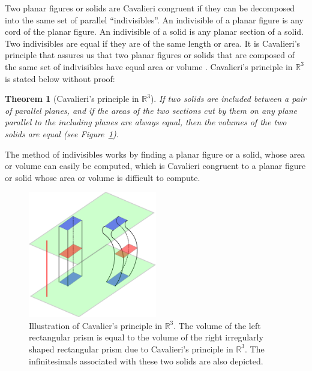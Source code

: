 \documentclass{article}
\theoremstyle{theorem}
\newtheorem{theorem}{Theorem}
\theoremstyle{definition}
\begin{document}
\noindent
Two planar figures or solids are Cavalieri congruent if they can be decomposed into the same set of parallel ``indivisibles''. An indivisible of 
a planar figure is any cord of the planar figure. An indivisible of a solid is any planar section of a solid. Two indivisibles are equal if they are of the same length or area.
It is Cavalieri's principle that assures us that two planar figures or solids that are composed of the same set of indivisibles have equal area or volume \cite{andersen1985,eves1991,jullien2015,malik1984,wildberger2002,william1917,young1985}. Cavalieri's principle 
in $\mathbb{R}^3$ is stated below without proof:

\begin{theorem}[Cavalieri's principle in $\mathbb{R}^3$]
If two solids are included between a pair of parallel planes, and if the areas of
the two sections cut by them on any plane parallel to the including planes are always
equal, then the volumes of the two solids are equal (see Figure~\ref{fig:cav_principle}).
\end{theorem}
\noindent
The method of indivisibles works by finding a planar figure or a solid, whose area or volume can easily be computed, which is Cavalieri congruent to a planar figure or solid whose 
area or volume is difficult to compute. 

\begin{figure}[htb]
\centering
\includegraphics[width=0.5\textwidth]{cav_principle.pdf}
\caption{Illustration of Cavalier's principle in $\mathbb{R}^3$. The volume of the left rectangular prism is equal to the volume of the right irregularly shaped rectangular prism 
due to Cavalieri's principle in $\mathbb{R}^3$. The infinitesimals associated with these two solids are also depicted.}
\label{fig:cav_principle}
\end{figure}
\end{document}
